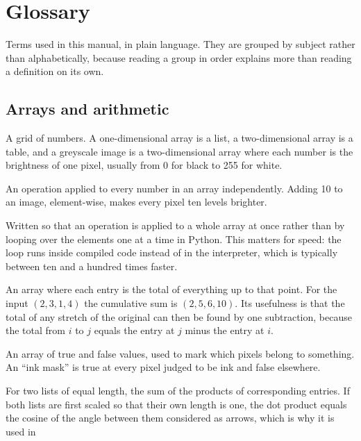 \chapter{Glossary}

Terms used in this manual, in plain language. They are grouped by subject
rather than alphabetically, because reading a group in order explains more
than reading a definition on its own.

\section{Arrays and arithmetic}
\begin{description}[style=nextline,leftmargin=1.4em]
  \item[Array] A grid of numbers. A one-dimensional array is a list, a
        two-dimensional array is a table, and a greyscale image is a
        two-dimensional array where each number is the brightness of one
        pixel, usually from 0 for black to 255 for white.
  \item[Element-wise] An operation applied to every number in an array
        independently. Adding 10 to an image, element-wise, makes every pixel
        ten levels brighter.
  \item[Vectorised] Written so that an operation is applied to a whole array
        at once rather than by looping over the elements one at a time in
        Python. This matters for speed: the loop runs inside compiled code
        instead of in the interpreter, which is typically between ten and a
        hundred times faster.
  \item[Cumulative sum, or prefix sum] An array where each entry is the total
        of everything up to that point. For the input $(2, 3, 1, 4)$ the
        cumulative sum is $(2, 5, 6, 10)$. Its usefulness is that the total
        of any stretch of the original can then be found by one subtraction,
        because the total from $i$ to $j$ equals the entry at $j$ minus the
        entry at $i$.
  \item[Mask] An array of true and false values, used to mark which pixels
        belong to something. An ``ink mask'' is true at every pixel judged to
        be ink and false elsewhere.
  \item[Dot product] For two lists of equal length, the sum of the products
        of corresponding entries. If both lists are first scaled so that
        their own length is one, the dot product equals the cosine of the
        angle between them considered as arrows, which is why it is used in

\end{description}
